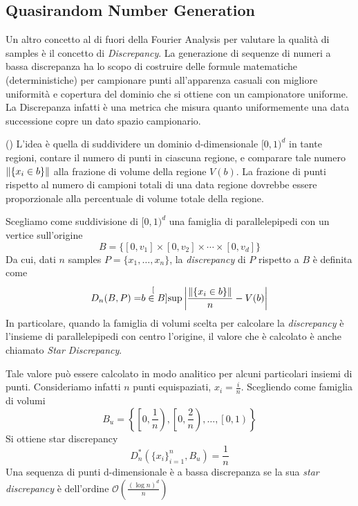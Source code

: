 \subsection{Quasirandom Number Generation}\label{chapter5:sampling:QuasiMonteCarlo}
Un altro concetto al di fuori della Fourier Analysis per valutare la qualit\`a di samples \`e il concetto di \textit{Discrepancy}. La generazione di 
sequenze di numeri a bassa discrepanza ha lo scopo di costruire delle formule matematiche (deterministiche) per campionare punti all'apparenza 
casuali con migliore uniformit\`a e copertura del dominio che si ottiene con un campionatore uniforme. La Discrepanza infatti \`e una metrica che 
misura quanto uniformemente una data successione copre un dato spazio campionario.\par
(\cite{pharr}) L'idea \`e quella di suddividere\footnotemark{} un dominio d-dimensionale $[0,1)^d$ in tante regioni, contare il numero di punti in 
ciascuna regione, e comparare tale numero $\norm{\{x_i\in b\}}$ alla frazione di volume della regione $V(b)$. La frazione di punti rispetto al numero 
di campioni totali di una data regione dovrebbe essere proporzionale alla percentuale di volume totale della regione.\par
{}
Scegliamo come suddivisione di $[0,1)^d$ una famiglia di parallelepipedi con un vertice sull'origine
\begin{equation}
	B=\{[0,v_1]\times [0,v_2]\times\cdots\times [0,v_d]\}
\end{equation}
Da cui, dati $n$ samples $P=\{x_1,\ldots,x_n\}$, la \textit{discrepancy} di $P$ rispetto a $B$ \`e definita come
\begin{equation}
	D_n(B,P)=\stackrel[{b\in B}]{}{\operatorname{sup}}\left\vert\frac{\norm{\{x_i\in b\}}}{n}-V(b)\right\vert
\end{equation}
In particolare, quando la famiglia di volumi scelta per calcolare la \textit{discrepancy} \`e l'insieme di parallelepipedi con centro l'origine, 
il valore che \`e calcolato \`e anche chiamato \textit{Star Discrepancy}.\par
Tale valore pu\`o essere calcolato in modo analitico per alcuni particolari insiemi di punti. Consideriamo infatti $n$ punti equispaziati, 
$x_i=\frac{i}{n}$. Scegliendo come famiglia di volumi 
\begin{equation*}
	B_u=\left\{\left[0,\frac{1}{n}\right),\left[0,\frac{2}{n}\right),\ldots,\left[0,1\right)\right\}
\end{equation*}
Si ottiene star discrepancy
\begin{equation}
	D_n^*(\{x_i\}_{i=1}^n,B_u)=\frac{1}{n}
\end{equation}
Una sequenza di punti d-dimensionale \`e a bassa discrepanza se la sua \textit{star discrepancy} \`e dell'ordine 
\mbox{$\mathcal{O}\left(\frac{(\log n)^d}{n}\right)$}
